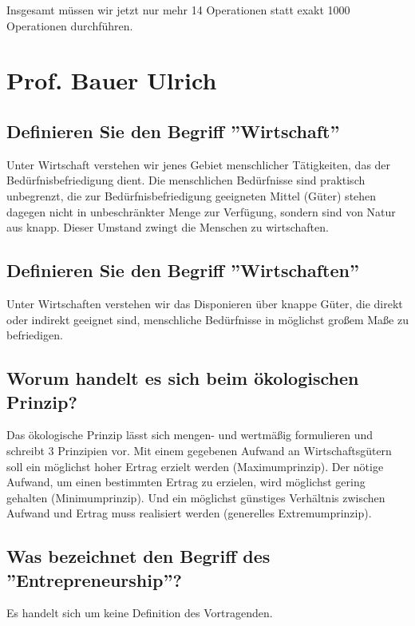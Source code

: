 Insgesamt müssen wir jetzt nur mehr 14 Operationen statt exakt 1000
Operationen durchführen.

\section{Prof. Bauer Ulrich}

\subsection{Definieren Sie den Begriff ''Wirtschaft''}

Unter Wirtschaft verstehen wir jenes Gebiet menschlicher Tätigkeiten,
das der Bedürfnisbefriedigung dient. Die menschlichen Bedürfnisse sind
praktisch unbegrenzt, die zur Bedürfnisbefriedigung geeigneten Mittel
(Güter) stehen dagegen nicht in unbeschränkter Menge zur Verfügung,
sondern sind von Natur aus knapp. Dieser Umstand zwingt die Menschen
zu wirtschaften.

\subsection{Definieren Sie den Begriff ''Wirtschaften''}

Unter Wirtschaften verstehen wir das Disponieren über knappe Güter, die
direkt oder indirekt geeignet sind, menschliche Bedürfnisse in möglichst
großem Maße zu befriedigen.

\subsection{Worum handelt es sich beim ökologischen Prinzip?}

Das ökologische Prinzip lässt sich mengen- und wertmäßig formulieren
und schreibt 3 Prinzipien vor. Mit einem gegebenen Aufwand an
Wirtschaftsgütern soll ein möglichst hoher Ertrag erzielt werden
(Maximumprinzip). Der nötige Aufwand, um einen bestimmten Ertrag zu
erzielen, wird möglichst gering gehalten (Minimumprinzip). Und ein
möglichst günstiges Verhältnis zwischen Aufwand und Ertrag muss
realisiert werden (generelles Extremumprinzip).

\subsection{Was bezeichnet den Begriff des ''Entrepreneurship''?}

 Es handelt sich um keine Definition des Vortragenden.

